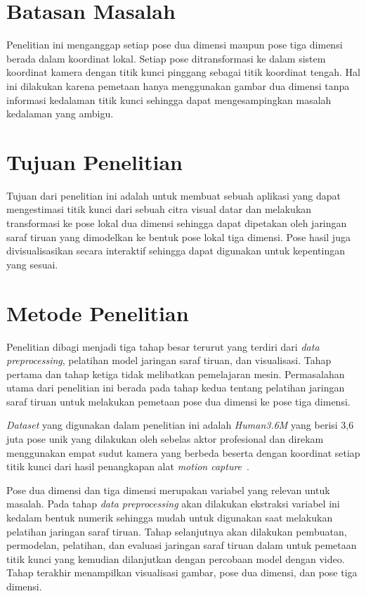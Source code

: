 \section{Batasan Masalah}
\label{sec:1-BatasMasalah}

Penelitian ini menganggap setiap pose dua dimensi maupun pose tiga dimensi berada dalam koordinat
lokal. Setiap pose ditransformasi ke dalam sistem koordinat kamera dengan titik kunci pinggang
sebagai titik koordinat tengah. Hal ini dilakukan karena pemetaan hanya menggunakan gambar dua dimensi
tanpa informasi kedalaman titik kunci sehingga dapat mengesampingkan masalah kedalaman yang ambigu.

\section{Tujuan Penelitian}
\label{sec:1-TujuanPenelitian}

Tujuan dari penelitian ini adalah untuk membuat sebuah aplikasi yang dapat mengestimasi titik kunci dari
sebuah citra visual datar dan melakukan transformasi ke pose lokal dua dimensi sehingga dapat
dipetakan oleh jaringan saraf tiruan yang dimodelkan ke bentuk pose lokal tiga dimensi. Pose hasil
juga divisualisasikan secara interaktif sehingga dapat digunakan untuk kepentingan yang sesuai.

\section{Metode Penelitian}
\label{sec:1-MetodePenelitian}

Penelitian dibagi menjadi tiga tahap besar terurut yang terdiri dari \textit{data preprocessing},
pelatihan model jaringan saraf tiruan, dan visualisasi. Tahap pertama dan tahap ketiga tidak
melibatkan pemelajaran mesin. Permasalahan utama dari penelitian ini berada pada tahap kedua tentang
pelatihan jaringan saraf tiruan untuk melakukan pemetaan pose dua dimensi ke pose tiga dimensi.

\textit{Dataset} yang digunakan dalam penelitian ini adalah \textit{Human3.6M} yang berisi 3,6 juta
pose unik yang dilakukan oleh sebelas aktor profesional dan direkam menggunakan empat sudut kamera
yang berbeda beserta dengan koordinat setiap titik kunci dari hasil penangkapan alat
\textit{motion capture}~\cite{h36m_pami}.

Pose dua dimensi dan tiga dimensi merupakan variabel yang relevan untuk masalah. Pada tahap
\textit{data preprocessing} akan dilakukan ekstraksi variabel ini kedalam bentuk numerik sehingga
mudah untuk digunakan saat melakukan pelatihan jaringan saraf tiruan. Tahap selanjutnya akan
dilakukan pembuatan, permodelan, pelatihan, dan evaluasi jaringan saraf tiruan dalam untuk
pemetaan titik kunci yang kemudian dilanjutkan dengan percobaan model dengan video. Tahap terakhir
menampilkan visualisasi gambar, pose dua dimensi, dan pose tiga dimensi.

